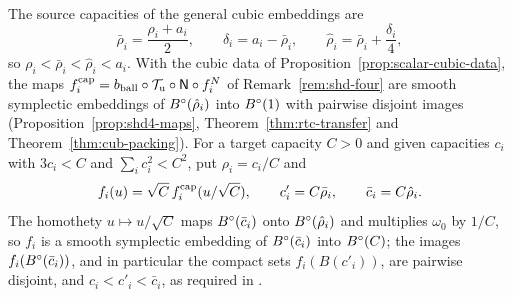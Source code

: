 The source capacities of the general cubic embeddings are
\begin{equation}\label{eq:scalar-enlargement}
 \bar\rho_i=\frac{\rho_i+a_i}{2},\qquad
 \delta_i=a_i-\bar\rho_i,\qquad \hat\rho_i=\bar\rho_i+\frac{\delta_i}{4},
\end{equation}
so $\rho_i<\bar\rho_i<\hat\rho_i<a_i$. With the cubic data of Proposition~\ref{prop:scalar-cubic-data}, the maps
$f_i^{\rm cap}=b_{\rm ball}\circ\mathcal T_{\rm u}\circ\mathsf N\circ f^N_i$ of Remark~\ref{rem:shd-four} are smooth
symplectic embeddings of $B^{\circ}(\hat\rho_i)$ into $B^{\circ}(1)$ with pairwise disjoint images
(Proposition~\ref{prop:shd4-maps}, Theorem~\ref{thm:rtc-transfer} and Theorem~\ref{thm:cub-packing}). For a target
capacity $C>0$ and given capacities $c_i$ with $3c_i<C$ and $\sum_ic_i^2<C^2$, put $\rho_i=c_i/C$ and
\begin{equation}\label{eq:scalar-cubic-scaling}
 f_i(u)=\sqrt C\, f_i^{\rm cap}(u/\sqrt C),\qquad
 c'_i=C\bar\rho_i,\qquad \bar c_i=C\hat\rho_i.
\end{equation}
The homothety $u\mapsto u/\sqrt C$ maps $B^{\circ}(\bar c_i)$ onto $B^{\circ}(\hat\rho_i)$ and multiplies $\omega_0$ by $1/C$, so
$f_i$ is a smooth symplectic embedding of $B^{\circ}(\bar c_i)$ into $B^{\circ}(C)$; the images $f_i(B^{\circ}(\bar c_i))$, and in
particular the compact sets $f_i(B(c'_i))$, are pairwise disjoint, and $c_i<c'_i<\bar c_i$, as required in
.
